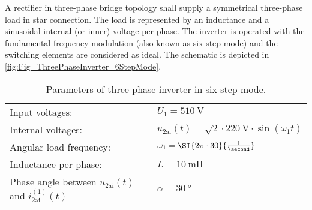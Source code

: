 
 



\newpage



A rectifier in three-phase bridge topology shall supply a
symmetrical three-phase load in star connection. The load is represented by an inductance and 
a sinusoidal internal (or inner) voltage per phase. The inverter is operated with the fundamental 
frequency modulation (also known as six-step mode) and the switching elements are considered as ideal. 
The schematic is depicted in \autoref{fig:Fig_ThreePhaseInverter_6StepMode}.



\begin{table}[ht]
    \centering  %
    \begin{tabular}{ll}
        \toprule
        Input voltages: & $U_\mathrm{1}=\SI{510}{\volt}$ \\
        Internal voltages: & $u_{\mathrm{2ai}}(t) = \sqrt{2} \cdot \SI{220}{\volt} \cdot \sin(\omega_1t)$ \\
        Angular load frequency: & $\omega_1 = \SI{2 \pi \cdot 30}{\frac{1}{\second}}$ \\ 
        Inductance per phase: & $L= \SI{10}{\milli \henry}$ \\
        Phase angle between  $u_{\mathrm{2ai}}(t)$ and $i_{\mathrm{2ai}}^\mathrm{(1)}(t)$ & $\alpha=\SI{30}{\degree}$ \\
        \bottomrule
    \end{tabular}
    \caption{Parameters of three-phase inverter in six-step mode.}  
    \label{table:ex07_Task2_ParametersOfTheCircuit}
\end{table}


